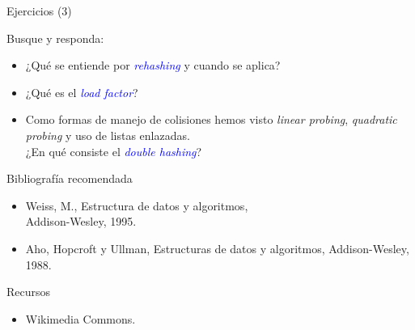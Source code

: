 \documentclass[handout]{beamer} %
\newcommand{\blue}[1]{\textcolor{blue}{#1}}
\begin{document}
\begin{frame}{Ejercicios (3)}

    Busque y responda:

    \begin{itemize}
        \item ¿Qué se entiende por \blue{\em rehashing} y cuando se aplica?
        \item ¿Qué es el \blue{\em load factor}?
        \item Como formas de manejo de colisiones hemos visto {\em linear probing}, {\em quadratic probing} y uso de listas enlazadas.\\
        ¿En qué consiste el \blue{\em double hashing}?
    \end{itemize}
\end{frame}


\begin{frame}
 \begin{block}{Bibliografía recomendada}
  \begin{itemize}
    \item Weiss, M., Estructura de datos y algoritmos,\\ Addison-Wesley, 1995.
    \item Aho, Hopcroft y Ullman, Estructuras de datos y algoritmos, Addison-Wesley, 1988.
  \end{itemize}
 \end{block}
 \begin{block}{Recursos}
  \begin{itemize}
    \item Wikimedia Commons.
  \end{itemize}
 \end{block}
\end{frame}
\end{document}
